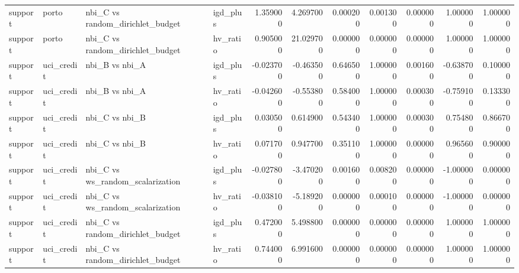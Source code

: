 \begin{landscape}
\begin{longtable}{llllrrrrrrr}
support & porto & nbi\_C vs random\_dirichlet\_budget & igd\_plus & 1.359000 & 4.269700 & 0.000200 & 0.001300 & 0.000000 & 1.000000 & 1.000000 \\
support & porto & nbi\_C vs random\_dirichlet\_budget & hv\_ratio & 0.905000 & 21.029700 & 0.000000 & 0.000000 & 0.000000 & 1.000000 & 1.000000 \\
support & uci\_credit & nbi\_B vs nbi\_A & igd\_plus & -0.023700 & -0.463500 & 0.646500 & 1.000000 & 0.001600 & -0.638700 & 0.100000 \\
support & uci\_credit & nbi\_B vs nbi\_A & hv\_ratio & -0.042600 & -0.553800 & 0.584000 & 1.000000 & 0.000300 & -0.759100 & 0.133300 \\
support & uci\_credit & nbi\_C vs nbi\_B & igd\_plus & 0.030500 & 0.614900 & 0.543400 & 1.000000 & 0.000300 & 0.754800 & 0.866700 \\
support & uci\_credit & nbi\_C vs nbi\_B & hv\_ratio & 0.071700 & 0.947700 & 0.351100 & 1.000000 & 0.000000 & 0.965600 & 0.900000 \\
support & uci\_credit & nbi\_C vs ws\_random\_scalarization & igd\_plus & -0.027800 & -3.470200 & 0.001600 & 0.008200 & 0.000000 & -1.000000 & 0.000000 \\
support & uci\_credit & nbi\_C vs ws\_random\_scalarization & hv\_ratio & -0.038100 & -5.189200 & 0.000000 & 0.000100 & 0.000000 & -1.000000 & 0.000000 \\
support & uci\_credit & nbi\_C vs random\_dirichlet\_budget & igd\_plus & 0.472000 & 5.498800 & 0.000000 & 0.000000 & 0.000000 & 1.000000 & 1.000000 \\
support & uci\_credit & nbi\_C vs random\_dirichlet\_budget & hv\_ratio & 0.744000 & 6.991600 & 0.000000 & 0.000000 & 0.000000 & 1.000000 & 1.000000 \\
\end{longtable}\endgroup

\end{landscape}
